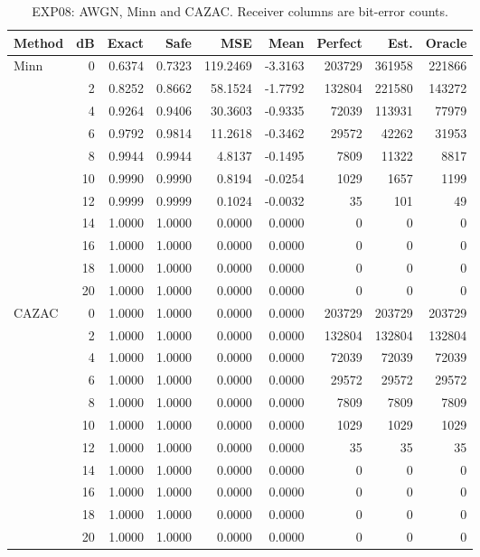 \begin{table}[!p]
\centering
\caption{EXP08: AWGN, Minn and CAZAC. Receiver columns are bit-error counts.}
\label{app:exp08-0-1}
\small
\setlength{\tabcolsep}{3pt}
\renewcommand{\arraystretch}{1.05}
\begin{tabular}{lrrrrrrrr}
\hline
Method & dB & Exact & Safe & MSE & Mean & Perfect & Est. & Oracle \\
\hline
Minn & 0 & 0.6374 & 0.7323 & 119.2469 & -3.3163 & 203729 & 361958 & 221866 \\
 & 2 & 0.8252 & 0.8662 & 58.1524 & -1.7792 & 132804 & 221580 & 143272 \\
 & 4 & 0.9264 & 0.9406 & 30.3603 & -0.9335 & 72039 & 113931 & 77979 \\
 & 6 & 0.9792 & 0.9814 & 11.2618 & -0.3462 & 29572 & 42262 & 31953 \\
 & 8 & 0.9944 & 0.9944 & 4.8137 & -0.1495 & 7809 & 11322 & 8817 \\
 & 10 & 0.9990 & 0.9990 & 0.8194 & -0.0254 & 1029 & 1657 & 1199 \\
 & 12 & 0.9999 & 0.9999 & 0.1024 & -0.0032 & 35 & 101 & 49 \\
 & 14 & 1.0000 & 1.0000 & 0.0000 & 0.0000 & 0 & 0 & 0 \\
 & 16 & 1.0000 & 1.0000 & 0.0000 & 0.0000 & 0 & 0 & 0 \\
 & 18 & 1.0000 & 1.0000 & 0.0000 & 0.0000 & 0 & 0 & 0 \\
 & 20 & 1.0000 & 1.0000 & 0.0000 & 0.0000 & 0 & 0 & 0 \\
\hline
CAZAC & 0 & 1.0000 & 1.0000 & 0.0000 & 0.0000 & 203729 & 203729 & 203729 \\
 & 2 & 1.0000 & 1.0000 & 0.0000 & 0.0000 & 132804 & 132804 & 132804 \\
 & 4 & 1.0000 & 1.0000 & 0.0000 & 0.0000 & 72039 & 72039 & 72039 \\
 & 6 & 1.0000 & 1.0000 & 0.0000 & 0.0000 & 29572 & 29572 & 29572 \\
 & 8 & 1.0000 & 1.0000 & 0.0000 & 0.0000 & 7809 & 7809 & 7809 \\
 & 10 & 1.0000 & 1.0000 & 0.0000 & 0.0000 & 1029 & 1029 & 1029 \\
 & 12 & 1.0000 & 1.0000 & 0.0000 & 0.0000 & 35 & 35 & 35 \\
 & 14 & 1.0000 & 1.0000 & 0.0000 & 0.0000 & 0 & 0 & 0 \\
 & 16 & 1.0000 & 1.0000 & 0.0000 & 0.0000 & 0 & 0 & 0 \\
 & 18 & 1.0000 & 1.0000 & 0.0000 & 0.0000 & 0 & 0 & 0 \\
 & 20 & 1.0000 & 1.0000 & 0.0000 & 0.0000 & 0 & 0 & 0 \\
\hline
\end{tabular}
\end{table}

